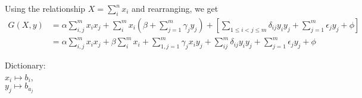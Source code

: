\documentclass[a4paper,english,notitlepage,longbibliography,showpacs,preprintnumbers,amsmath,amssymb,aps,prx,nofootinbib,12pt,superscriptaddress]{revtex4-1}
\begin{document}
\noindent Using the relationship $X = \sum_i^nx_i$ and rearranging, we get
\begin{equation}
\begin{split}
  \left.
  G(X,y)
  \right.
  &= \alpha\sum_{i,j}^mx_ix_j + \sum_i^mx_i\left(\beta + \sum_{j=1}^m \gamma_jy_j\right) + \left[\sum_{1\leq i < j \leq m} \delta_{ij}y_iy_j + \sum_{j=1}^m \epsilon_jy_j+\phi\right]\\
  &= \alpha\sum_{i,j}^mx_ix_j + \beta\sum_i^mx_i + \sum_{1,j=1}^m \gamma_jx_iy_j + \sum_{ij}^m \delta_{ij}y_iy_j + \sum_{j=1}^m \epsilon_jy_j+\phi
\end{split}
\end{equation}

Dictionary: \\
$x_i\mapsto b_i$, \\
$y_j\mapsto b_{a_j}$\\



\end{document}
